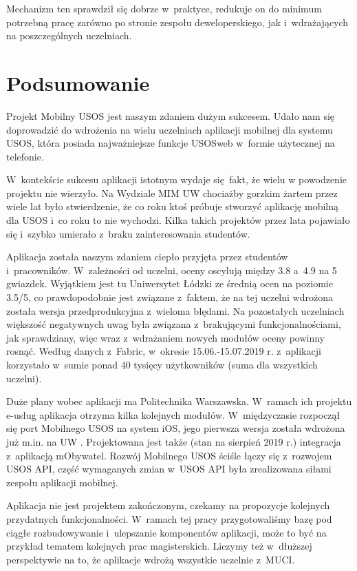 \documentclass{pracamgr}
\begin{document}
Mechanizm ten sprawdził się dobrze w~praktyce, redukuje on do minimum potrzebną pracę
zarówno po stronie zespołu deweloperskiego, jak i~wdrażających na poszczególnych uczelniach.

\chapter{Podsumowanie}

Projekt Mobilny USOS jest naszym zdaniem dużym sukcesem. Udało nam się doprowadzić do
wdrożenia na wielu uczelniach aplikacji mobilnej dla systemu USOS, która posiada
najważniejsze funkcje USOSweb w~formie użytecznej na telefonie.

W~kontekście sukcesu aplikacji istotnym wydaje się fakt, że wielu w powodzenie 
projektu nie wierzyło. Na Wydziale MIM UW chociażby gorzkim żartem przez wiele
lat było stwierdzenie, że co roku ktoś próbuje stworzyć aplikację mobilną dla USOS
i~co roku to nie wychodzi. Kilka takich projektów przez lata pojawiało się i~szybko
umierało z~braku zainteresowania studentów. 

Aplikacja została naszym zdaniem ciepło przyjęta przez studentów i~pracowników.
W~zależności od uczelni, oceny oscylują między 3.8 a~4.9 na 5 gwiazdek.
Wyjątkiem jest tu Uniwersytet Łódzki ze średnią ocen na poziomie 3.5/5, co prawdopodobnie
jest związane z~faktem, że na tej uczelni wdrożona została wersja przedprodukcyjna z~wieloma
błędami. Na pozostałych uczelniach większość negatywnych uwag była związana z~brakującymi
funkcjonalnościami, jak sprawdziany, więc wraz z~wdrażaniem nowych modułów oceny powinny
rosnąć. Według danych z~Fabric, w~okresie 15.06.-15.07.2019 r. z~aplikacji korzystało w~sumie
ponad 40 tysięcy użytkowników (suma dla wszystkich uczelni).

Duże plany wobec aplikacji ma Politechnika Warszawska. W~ramach ich projektu e-usług
aplikacja otrzyma kilka kolejnych modułów. W~międzyczasie
rozpoczął się port Mobilnego USOS na system iOS, jego pierwsza wersja została wdrożona
już m.in. na UW \cite{appstore, uw-ios}. Projektowana jest także (stan na sierpień 2019 r.)
integracja z~aplikacją mObywatel. Rozwój Mobilnego USOS ściśle łączy się z~rozwojem USOS API,
część wymaganych zmian w~USOS API była zrealizowana siłami zespołu aplikacji mobilnej.

Aplikacja nie jest projektem zakończonym, czekamy na propozycje kolejnych przydatnych
funkcjonalności. W~ramach tej
pracy przygotowaliśmy bazę pod ciągłe rozbudowywanie i~ulepszanie komponentów aplikacji,
może to być na przykład tematem kolejnych prac magisterskich. Liczymy też w~dłuższej
perspektywie na to, że aplikacje wdrożą wszystkie uczelnie z~MUCI.
\end{document}
